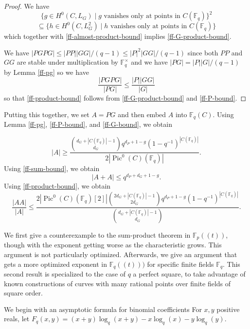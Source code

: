 \documentclass{amsart}
\numberwithin{equation}{section}
\begin{document}
\begin{proof} We have \[ \{g \in H^0(C, L_G) \mid g \textrm{ vanishes only at points in } C(\mathbb F_q)\}^2\]\[ \subseteq \{ h \in H^0(C, L_G^2) \mid h \textrm{ vanishes only at points in } C(\mathbb F_q)\} \] which together with \eqref{ff-almost-product-bound} implies \eqref{ff-G-product-bound}.

We have $ |PGPG| \leq |PP| |GG|/(q-1) \leq |P|^2 |GG|/(q-1)$ since both $PP$ and $GG$ are stable under multiplication by $\mathbb F_q^\times$ and we have $|PG|=|P||G|/(q-1)$ by Lemma \ref{ff-pg} so we have
\[ \frac{ |PGPG|}{|PG|} \leq \frac{ |P| |GG|}{|G|} \] so that \eqref{ff-product-bound} follows from \eqref{ff-G-product-bound} and \eqref{ff-P-bound}.
\end{proof}




Putting this together, we set $A = PG$ and then embed $A$ into $\mathbb F_q(C)$. Using  Lemma \ref{ff-pg}, \eqref{ff-P-bound}, and \eqref{ff-G-bound}, we obtain

 \begin{equation}\label{ff-a} |A| \geq \frac{ \binom{d_G + |C(\mathbb F_q)|-1}{d_G} q^{ d_P + 1-g} (1-q^{-1})^{|C(\mathbb F_q)|}}{ 2|\operatorname{Pic}^0(C)(\mathbb F_q)|}.\end{equation} Using \eqref{ff-sum-bound}, we obtain  \begin{equation}\label{ff-a-sum} | A + A |\leq q^{ d_P+d_G  + 1-g}.\end{equation} Using \eqref{ff-product-bound}, we obtain \begin{equation}\label{ff-a-product}\frac{|AA|}{|A|} \leq \frac{ 2 |\operatorname{Pic}^0(C)(\mathbb F_q)[2]| \binom{2d_G + |C(\mathbb F_q)|-1}{2d_G} q^{ d_P + 1-g} (1-q^{-1})^{|C(\mathbb F_q)|}}{ \binom{d_G + |C(\mathbb F_q)|-1}{d_G}}.\end{equation}

We first give a counterexample to the sum-product theorem in $\mathbb F_p((t))$, though with the exponent getting worse as the characteristic grows. This argument is not particularly optimized. Afterwards, we give an argument that gets a more optimized exponent in $\mathbb F_q((t)))$ for specific finite fields $\mathbb F_q$. This second result is specialized to the case of $q$ a perfect square, to take advantage of known constructions of curves with many rational points over finite fields of square order.

We begin with an asymptotic formula for binomial coefficients For $x,y$ positive reals, let $F_q(x,y) = (x+y)\log_q(x+y) - x \log_q(x) - y\log_q(y)$.
\end{document}
